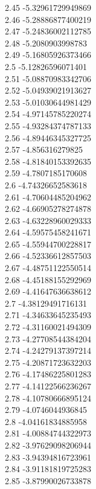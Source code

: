 {2.45	-5.32961729949869\\
2.46	-5.28886877400219\\
2.47	-5.24836002112785\\
2.48	-5.2080903998783\\
2.49	-5.16805926373466\\
2.5	-5.12826596071401\\
2.51	-5.08870983342706\\
2.52	-5.04939021913627\\
2.53	-5.01030644981429\\
2.54	-4.97145785220274\\
2.55	-4.93284374787133\\
2.56	-4.89446345327725\\
2.57	-4.856316279825\\
2.58	-4.81840153392635\\
2.59	-4.7807185170608\\
2.6	-4.74326652583618\\
2.61	-4.70604485204962\\
2.62	-4.66905278274878\\
2.63	-4.63228960029333\\
2.64	-4.59575458241671\\
2.65	-4.55944700228817\\
2.66	-4.52336612857503\\
2.67	-4.48751122550514\\
2.68	-4.45188155292969\\
2.69	-4.41647636638612\\
2.7	-4.38129491716131\\
2.71	-4.34633645235493\\
2.72	-4.31160021494309\\
2.73	-4.27708544384204\\
2.74	-4.24279137397214\\
2.75	-4.20871723632203\\
2.76	-4.17486225801283\\
2.77	-4.14122566236267\\
2.78	-4.10780666895124\\
2.79	-4.0746044936845\\
2.8	-4.04161834885958\\
2.81	-4.00884744322973\\
2.82	-3.97629098206944\\
2.83	-3.94394816723961\\
2.84	-3.91181819725283\\
2.85	-3.87990026733878\\
}
